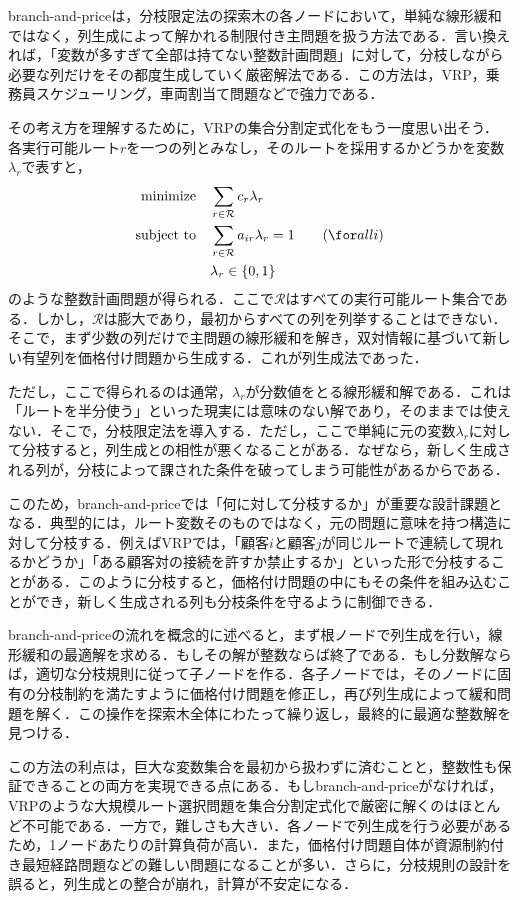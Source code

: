 branch-and-priceは，分枝限定法の探索木の各ノードにおいて，単純な線形緩和ではなく，列生成によって解かれる制限付き主問題を扱う方法である．言い換えれば，「変数が多すぎて全部は持てない整数計画問題」に対して，分枝しながら必要な列だけをその都度生成していく厳密解法である．この方法は，VRP，乗務員スケジューリング，車両割当て問題などで強力である．

その考え方を理解するために，VRPの集合分割定式化をもう一度思い出そう．各実行可能ルート$r$を一つの列とみなし，そのルートを採用するかどうかを変数$\lambda_r$で表すと，
\begin{align}
\text{minimize}\quad&\sum_{r\in \mathcal{R}}c_r\lambda_r\\
\text{subject to}\quad&\sum_{r\in \mathcal{R}}a_{ir}\lambda_r=1\qquad(\for all i)\\
&\lambda_r\in \{0,1\}
\end{align}
のような整数計画問題が得られる．ここで$\mathcal{R}$はすべての実行可能ルート集合である．しかし，$\mathcal{R}$は膨大であり，最初からすべての列を列挙することはできない．そこで，まず少数の列だけで主問題の線形緩和を解き，双対情報に基づいて新しい有望列を価格付け問題から生成する．これが列生成法であった．

ただし，ここで得られるのは通常，$\lambda_r$が分数値をとる線形緩和解である．これは「ルートを半分使う」といった現実には意味のない解であり，そのままでは使えない．そこで，分枝限定法を導入する．ただし，ここで単純に元の変数$\lambda_r$に対して分枝すると，列生成との相性が悪くなることがある．なぜなら，新しく生成される列が，分枝によって課された条件を破ってしまう可能性があるからである．

このため，branch-and-priceでは「何に対して分枝するか」が重要な設計課題となる．典型的には，ルート変数そのものではなく，元の問題に意味を持つ構造に対して分枝する．例えばVRPでは，「顧客$i$と顧客$j$が同じルートで連続して現れるかどうか」「ある顧客対の接続を許すか禁止するか」といった形で分枝することがある．このように分枝すると，価格付け問題の中にもその条件を組み込むことができ，新しく生成される列も分枝条件を守るように制御できる．

branch-and-priceの流れを概念的に述べると，まず根ノードで列生成を行い，線形緩和の最適解を求める．もしその解が整数ならば終了である．もし分数解ならば，適切な分枝規則に従って子ノードを作る．各子ノードでは，そのノードに固有の分枝制約を満たすように価格付け問題を修正し，再び列生成によって緩和問題を解く．この操作を探索木全体にわたって繰り返し，最終的に最適な整数解を見つける．

この方法の利点は，巨大な変数集合を最初から扱わずに済むことと，整数性も保証できることの両方を実現できる点にある．もしbranch-and-priceがなければ，VRPのような大規模ルート選択問題を集合分割定式化で厳密に解くのはほとんど不可能である．一方で，難しさも大きい．各ノードで列生成を行う必要があるため，1ノードあたりの計算負荷が高い．また，価格付け問題自体が資源制約付き最短経路問題などの難しい問題になることが多い．さらに，分枝規則の設計を誤ると，列生成との整合が崩れ，計算が不安定になる．

